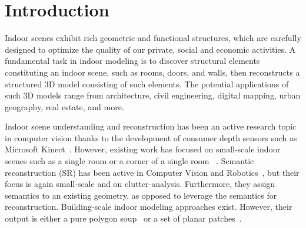 \section{Introduction}

Indoor scenes exhibit rich geometric and functional structures, which
are carefully designed to optimize the quality of our private, social
and economic activities. A fundamental task in indoor modeling is to
discover structural elements constituting an indoor scene, such as
rooms, doors, and walls, then reconstructs a structured 3D model
consisting of such elements.
The potential applications of such 3D models range from architecture,
civil engineering, digital mapping, urban geography, real estate, and
more.

Indoor scene understanding and reconstruction has been an
active research topic in computer vision thanks to the development of
consumer depth sensors such as Microsoft
Kinect~\cite{kinect_fusion}. However, existing work has focused on
small-scale indoor scenes such as a single room or a corner of a single room
~\cite{Hoiem13,nyu_12}.  Semantic reconstruction (SR) has been active in Computer Vision and Robotics~\cite{herbst2014toward}, but their focus is again small-scale and on clutter-analysis. %
Furthermore, they assign semantics to an existing geometry, as opposed
to leverage the semantics for reconstruction.
%
Building-scale indoor modeling approaches exist. However, their output
is either a pure polygon soup~\cite{eccv_museum} or a set of planar
patches~\cite{xiong2013automatic}.


